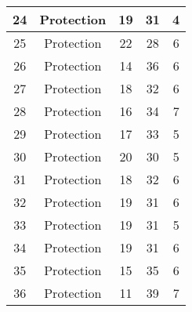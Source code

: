\documentclass[results.tex]{subfiles}
\begin{document}
\begin{center}
\begin{tabular}{| c || c | c | c | c |}
            \hline
            24                      & Protection                   & 19                     & 31                      & 4                    \\
            \hline
            25                      & Protection                   & 22                     & 28                      & 6                    \\
            \hline
            26                      & Protection                   & 14                     & 36                      & 6                    \\
            \hline
            27                      & Protection                   & 18                     & 32                      & 6                    \\
            \hline
            28                      & Protection                   & 16                     & 34                      & 7                    \\
            \hline
            29                      & Protection                   & 17                     & 33                      & 5                    \\
            \hline
            30                      & Protection                   & 20                     & 30                      & 5                    \\
            \hline
            31                      & Protection                   & 18                     & 32                      & 6                    \\
            \hline
            32                      & Protection                   & 19                     & 31                      & 6                    \\
            \hline
            33                      & Protection                   & 19                     & 31                      & 5                    \\
            \hline
            34                      & Protection                   & 19                     & 31                      & 6                    \\
            \hline
            35                      & Protection                   & 15                     & 35                      & 6                    \\
            \hline
            36                      & Protection                   & 11                     & 39                      & 7                    \\

\end{tabular}
\end{center}
\end{document}
